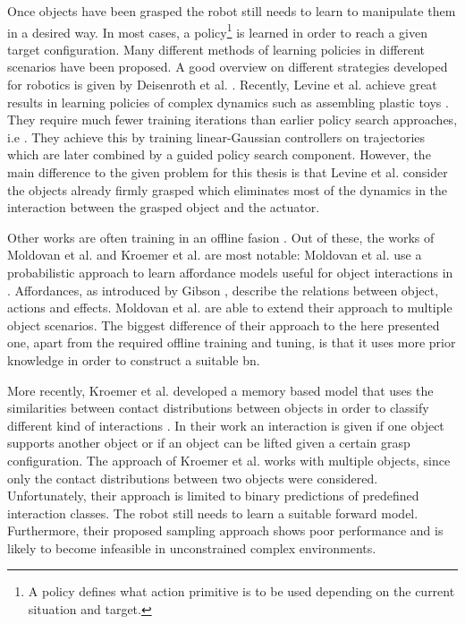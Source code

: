 Once objects have been grasped the robot still needs to learn to manipulate them in a desired way. In most cases, a policy\footnote{A policy defines what action primitive is to be used depending on the current situation and target.} is learned in order to reach a given target configuration. Many different methods of learning policies in different scenarios have been proposed. A good overview on different strategies developed for robotics is given by Deisenroth et al. \cite{deisenroth2013survey}. Recently, Levine et al. achieve great results in learning policies of complex dynamics such as assembling plastic toys \cite{levine2015learning}. They require much fewer training iterations than earlier policy search approaches, i.e \cite{otherPolicySearchs}. They achieve this by training linear-Gaussian controllers on trajectories which are later combined by a guided policy search component.
However, the main difference to the given problem for this thesis is that Levine et al. consider the objects already firmly grasped which eliminates most of the dynamics in the interaction between the grasped object and the actuator.

Other works are often training in an offline fasion
\cite{nishide2008predicting, moldovan2012learning, contactPrediction}. Out of these, the works of Moldovan et al. and Kroemer et al. are most notable:
Moldovan et al. use a probabilistic approach to learn affordance models useful for object interactions in \cite{moldovan2012learning}. Affordances, as introduced by Gibson \cite{affordances}, describe the relations between object, actions and effects. Moldovan et al. are able to extend their approach to multiple object scenarios. The biggest difference of their approach to the here presented one, apart from the required offline training and tuning, is that it uses more prior knowledge in order to construct a suitable \gls{bn}.

More recently, Kroemer et al. developed a memory based model that uses the similarities between contact distributions between objects in order to classify different kind of interactions \cite{contactPrediction}. In their work an interaction is given if one object supports another object or if an object can be lifted given a certain grasp configuration. The approach of Kroemer et al. works with multiple objects, since only the contact distributions between two objects were considered. Unfortunately, their approach is limited to binary predictions of predefined interaction classes. The robot still needs to learn a suitable forward model. Furthermore, their proposed sampling approach shows poor performance and is likely to become infeasible in unconstrained complex environments.

